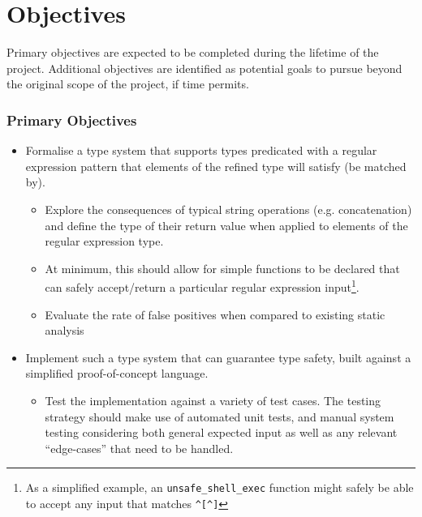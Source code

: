 \documentclass[a4paper]{article}
\newcommand{\infobox}[1] {\colorbox{id7-sky-blue-tint}{\parbox{\textwidth}{\vspace{.75\baselineskip}\centering\parbox{0.95\textwidth}{\faicon{info-circle} \sffamily#1\vspace{.75\baselineskip}}}}}
\begin{document}
    \section*{Objectives}
    
\infobox{Primary objectives are expected to be completed during the lifetime of the project. Additional objectives are identified as potential goals to pursue beyond the original scope of the project, if time permits.}

    \subsubsection*{Primary Objectives}
    
    \begin{itemize}
        \item Formalise a type system that supports types predicated with a regular expression pattern that elements of the refined type will satisfy (be matched by).
       
        \begin{itemize}
           \item Explore the consequences of typical string operations (e.g. concatenation) and define the type of their return value when applied to elements of the regular expression type.
           
           \item At minimum, this should allow for simple functions to be declared that can safely accept/return a particular regular expression input\footnote{As a simplified example, an \texttt{unsafe\_shell\_exec} function might safely be able to accept any input that matches \texttt{\textasciicircum{}[\textasciicircum{}\textasciigrave{}]\textdollar{}}}.
           
           \item Evaluate the rate of false positives when compared to existing static analysis 
       \end{itemize}
        
        \item Implement such a type system that can guarantee type safety, built against a simplified proof-of-concept language.
        \begin{itemize}
            \item Test the implementation against a variety of test cases. The testing strategy should make use of automated unit tests, and manual system testing considering both general expected input as well as any relevant ``edge-cases'' that need to be handled.
        \end{itemize}
    \end{itemize}
\end{document}
